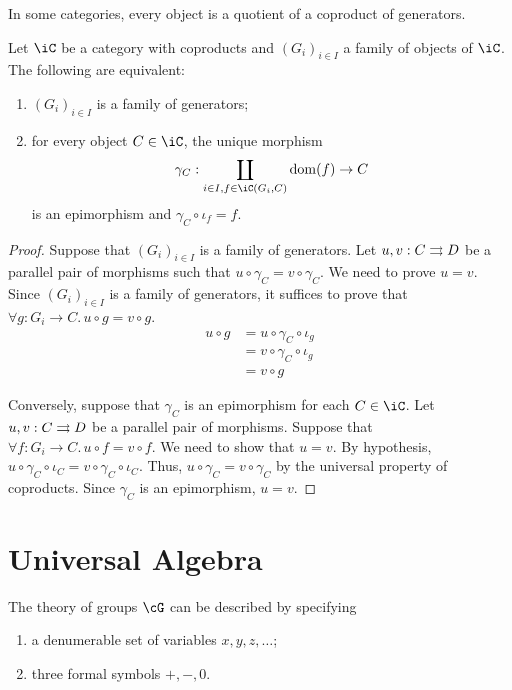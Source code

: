 \documentclass{amsart}
\begin{document}
In some categories, every object is a quotient of a coproduct of generators.
\begin{prop}
  Let $\iC$ be a category with coproducts and $(G_{i})_{i \in I}$ a family of objects of $\iC$.
  The following are equivalent:
  \begin{enumerate}
  \item $(G_{i})_{i \in I}$ is a family of generators;
  \item for every object $C \in \iC$, the unique morphism
    \[
      \gamma_{C} : \coprod_{i \in I, f \in \iC(G_{i}, C)} \dom(f) \to C
    \]
    is an epimorphism and $\gamma_{C} \circ \iota_{f} = f$.
  \end{enumerate}
\end{prop}
\begin{proof}
  Suppose that $(G_{i})_{i \in I}$ is a family of generators.
  Let $u,v : C \rightrightarrows D$ be a parallel pair of morphisms such that $u \circ \gamma_{C} = v \circ \gamma_{C}$.
  We need to prove $u = v$.
  Since $(G_{i})_{i \in I}$ is a family of generators, it suffices to prove that $\forall g : G_{i} \to C.\,u \circ g = v \circ g$.
  \begin{align}
    u \circ g &= u \circ \gamma_{C} \circ \iota_{g}\\
          &= v \circ \gamma_{C} \circ \iota_{g}\\
          &= v \circ g
  \end{align}

  Conversely, suppose that $\gamma_{C}$ is an epimorphism for each $C \in \iC$.
  Let $u,v : C \rightrightarrows D$ be a parallel pair of morphisms.
  Suppose that $\forall f : G_{i} \to C.\, u \circ f = v \circ f$.
  We need to show that $u = v$.
  By hypothesis, $u \circ \gamma_{C} \circ \iota_{C} = v \circ \gamma_{C} \circ \iota_{C}$.
  Thus, $u \circ \gamma_{C} = v \circ \gamma_{C}$ by the universal property of coproducts.
  Since $\gamma_{C}$ is an epimorphism, $u = v$.
\end{proof}

\section{Universal Algebra}
\label{sec:universal-algebra}

The theory of groups $\cG$ can be described by specifying
\begin{enumerate}
\item a denumerable set of variables $x, y, z, \ldots$;
\item three formal symbols $+, -, 0$.
\end{enumerate}
\end{document}

